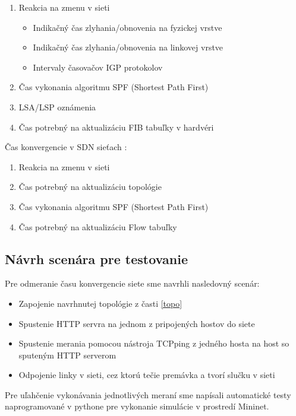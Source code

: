 \documentclass[conference]{IEEEtran}
\begin{document}
\begin{enumerate}
	\item{Reakcia na zmenu v sieti}
		\begin{itemize}
			\item{Indikačný čas zlyhania/obnovenia na fyzickej vrstve}
			\item{Indikačný čas zlyhania/obnovenia na linkovej vrstve}
			\item{Intervaly časovačov IGP protokolov}
		\end{itemize}
	\item{Čas vykonania algoritmu SPF (Shortest Path First)}
	\item{LSA/LSP oznámenia}
	\item{Čas potrebný na aktualizáciu FIB tabuľky v hardvéri}
\end{enumerate}

Čas konvergencie v SDN sieťach \cite{nineth}:

\begin{enumerate}
	\item{Reakcia na zmenu v sieti}
	\item{Čas potrebný na aktualizáciu topológie}
	\item{Čas vykonania algoritmu SPF (Shortest Path First)}
	\item{Čas potrebný na aktualizáciu Flow tabuľky}
\end{enumerate}

\subsection{Návrh scenára pre testovanie}

Pre odmeranie času konvergencie siete sme navrhli nasledovný scenár:

\begin{itemize}
	\item{Zapojenie navrhnutej topológie z časti \ref{topo}}
	\item{Spustenie HTTP servra na jednom z pripojených hostov do siete}
	\item{Spustenie merania pomocou nástroja TCPping z jedného hosta na host so sputeným HTTP serverom}
	\item{Odpojenie linky v sieti, cez ktorú tečie premávka a tvorí slučku v sieti}
\end{itemize}

Pre uľahčenie vykonávania jednotlivých meraní sme napísali automatické testy naprogramované v pythone pre vykonanie simulácie v prostredí Mininet. 
\end{document}
